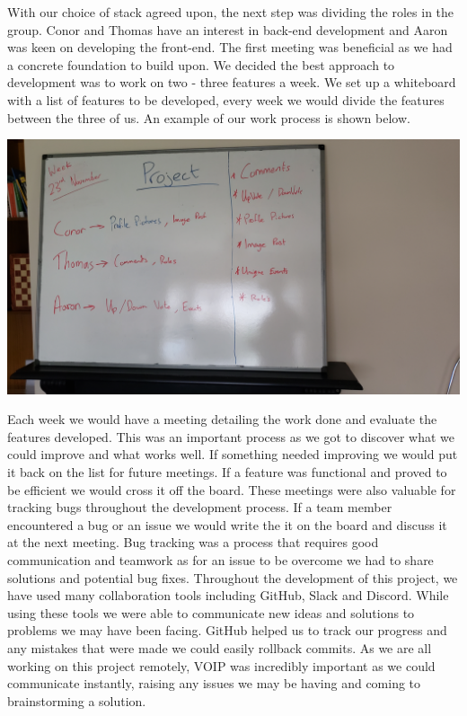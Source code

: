 \begin{itemize}
With our choice of stack agreed upon, the next step was dividing the roles in the group. Conor and Thomas have an interest in back-end development and Aaron was keen on developing the front-end. The first meeting was beneficial as we had a concrete foundation to build upon. \newline
We decided the best approach to development was to work on two - three features a week. We set up a whiteboard with a list of features to be developed, every week we would divide the features between the three of us. An example of our work process is shown below.
\begin{center}
  \includegraphics[scale=0.09]{img/whiteboard.jpg}
\end{center}
Each week we would have a meeting detailing the work done and evaluate the features developed. This was an important process as we got to discover what we could improve and what works well. If something needed improving we would put it back on the list for future meetings. If a feature was functional and proved to be efficient we would cross it off the board. \newline
These meetings were also valuable for tracking bugs throughout the development process. If a team member encountered a bug or an issue we would write the it on the board and discuss it at the next meeting. Bug tracking was a process that requires good communication and teamwork as for an issue to be overcome we had to share solutions and potential bug fixes. 
\newline
Throughout the development of this project, we have used many collaboration tools including GitHub, Slack and Discord. While using these tools we were able to communicate new ideas and solutions to problems we may have been facing. GitHub helped us to track our progress and any mistakes that were made we could easily rollback commits. As we are all working on this project remotely, VOIP was incredibly important as we could communicate instantly, raising any issues we may be having and coming to brainstorming a solution.


\end{itemize}
